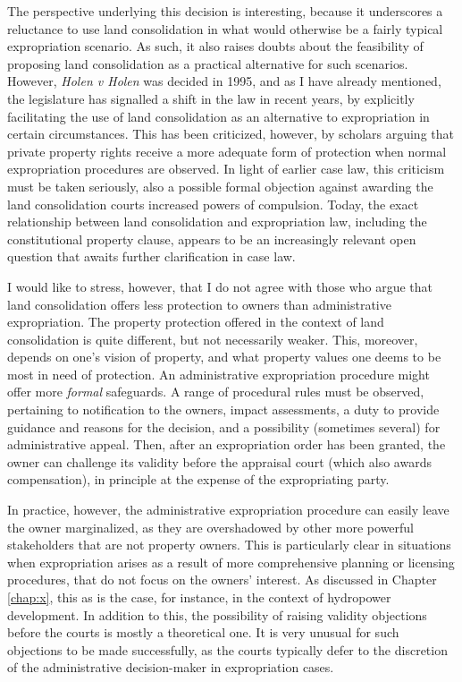 The perspective underlying this decision is interesting, because it underscores a reluctance to use land consolidation in what would otherwise be a fairly typical expropriation scenario. As such, it also raises doubts about the feasibility of proposing land consolidation as a practical alternative for such scenarios. However, {\it Holen v Holen} was decided in 1995, and as I have already mentioned, the legislature has signalled a shift in the law in recent years, by explicitly facilitating the use of land consolidation as an alternative to expropriation in certain circumstances. This has been criticized, however, by scholars arguing that private property rights receive a more adequate form of protection when normal expropriation procedures are observed. In light of earlier case law, this criticism must be taken seriously, also a possible formal objection against awarding the land consolidation courts increased powers of compulsion. Today, the exact relationship between land consolidation and expropriation law, including the constitutional property clause, appears to be an increasingly relevant open question that awaits further clarification in case law. 

I would like to stress, however, that I do not agree with those who argue that land consolidation offers less protection to owners than administrative expropriation. The property protection offered in the context of land consolidation is quite different, but not necessarily weaker. This, moreover, depends on one's vision of property, and what property values one deems to be most in need of protection. An administrative expropriation procedure might offer more {\it formal} safeguards. A range of procedural rules must be observed, pertaining to notification to the owners, impact assessments, a duty to provide guidance and reasons for the decision, and a possibility (sometimes several) for administrative appeal. Then, after an expropriation order has been granted, the owner can challenge its validity before the appraisal court (which also awards compensation), in principle at the expense of the expropriating party. 

In practice, however, the administrative expropriation procedure can easily leave the owner marginalized, as they are overshadowed by other more powerful stakeholders that are not property owners. This is particularly clear in situations when expropriation arises as a result of more comprehensive planning or licensing procedures, that do not focus on the owners' interest. As discussed in Chapter \ref{chap:x}, this as is the case, for instance, in the context of hydropower development. In addition to this, the possibility of raising validity objections before the courts is mostly a theoretical one. It is very unusual for such objections to be made successfully, as the courts typically defer to the discretion of the administrative decision-maker in expropriation cases.

